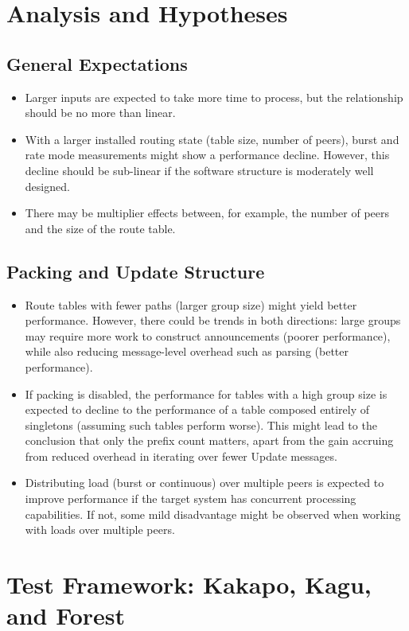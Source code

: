 \section{Analysis and Hypotheses}

\subsection{General Expectations}
\begin{itemize}
    \item Larger inputs are expected to take more time to process, but the relationship should be no more than linear.
    \item With a larger installed routing state (table size, number of peers), burst and rate mode measurements might show a performance decline. However, this decline should be sub-linear if the software structure is moderately well designed.
    \item There may be multiplier effects between, for example, the number of peers and the size of the route table.
\end{itemize}

\subsection{Packing and Update Structure}
\begin{itemize}
    \item Route tables with fewer paths (larger group size) might yield better performance. However, there could be trends in both directions: large groups may require more work to construct announcements (poorer performance), while also reducing message-level overhead such as parsing (better performance).
    \item If packing is disabled, the performance for tables with a high group size is expected to decline to the performance of a table composed entirely of singletons (assuming such tables perform worse). This might lead to the conclusion that only the prefix count matters, apart from the gain accruing from reduced overhead in iterating over fewer Update messages.
    \item Distributing load (burst or continuous) over multiple peers is expected to improve performance if the target system has concurrent processing capabilities. If not, some mild disadvantage might be observed when working with loads over multiple peers.
\end{itemize}

\section{Test Framework: Kakapo, Kagu, and Forest}

